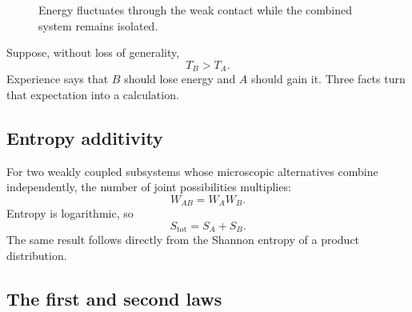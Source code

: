 \begin{figure}[t]
\centering
{}
\caption{Energy fluctuates through the weak contact while the combined system
remains isolated.}
\end{figure}

Suppose, without loss of generality,
\begin{equation}
 T_B>T_A.
 \label{eq:sm2-temperature-order}
\end{equation}
Experience says that \(B\) should lose energy and \(A\) should gain it. Three
facts turn that expectation into a calculation.

\subsection{Entropy additivity}

For two weakly coupled subsystems whose microscopic alternatives combine
independently, the number of joint possibilities multiplies:
\[
 W_{AB}=W_AW_B.
\]
Entropy is logarithmic, so
\begin{equation}
 S_{\mathrm{tot}}=S_A+S_B.
 \label{eq:sm2-entropy-additivity}
\end{equation}
The same result follows directly from the Shannon entropy of a product
distribution.

\begin{classroomqa}
\end{classroomqa}

\subsection{The first and second laws}

